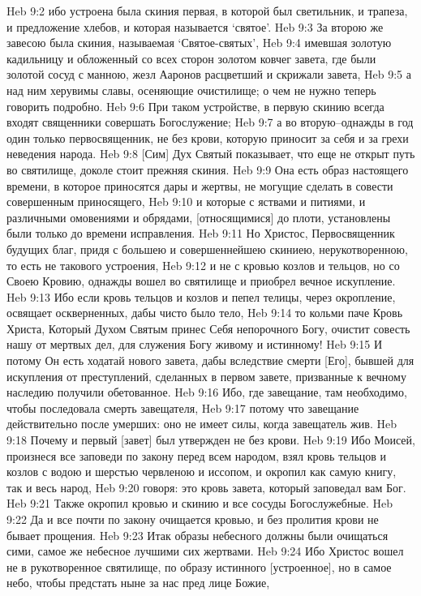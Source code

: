 Heb 9:2  ибо устроена была скиния первая, в которой был светильник, и трапеза, и предложение хлебов, и которая называется `святое'.
Heb 9:3  За второю же завесою была скиния, называемая `Святое-святых',
Heb 9:4  имевшая золотую кадильницу и обложенный со всех сторон золотом ковчег завета, где были золотой сосуд с манною, жезл Ааронов расцветший и скрижали завета,
Heb 9:5  а над ним херувимы славы, осеняющие очистилище; о чем не нужно теперь говорить подробно.
Heb 9:6  При таком устройстве, в первую скинию всегда входят священники совершать Богослужение;
Heb 9:7  а во вторую--однажды в год один только первосвященник, не без крови, которую приносит за себя и за грехи неведения народа.
Heb 9:8  [Сим] Дух Святый показывает, что еще не открыт путь во святилище, доколе стоит прежняя скиния.
Heb 9:9  Она есть образ настоящего времени, в которое приносятся дары и жертвы, не могущие сделать в совести совершенным приносящего,
Heb 9:10  и которые с яствами и питиями, и различными омовениями и обрядами, [относящимися] до плоти, установлены были только до времени исправления.
Heb 9:11  Но Христос, Первосвященник будущих благ, придя с большею и совершеннейшею скиниею, нерукотворенною, то есть не такового устроения,
Heb 9:12  и не с кровью козлов и тельцов, но со Своею Кровию, однажды вошел во святилище и приобрел вечное искупление.
Heb 9:13  Ибо если кровь тельцов и козлов и пепел телицы, через окропление, освящает оскверненных, дабы чисто было тело,
Heb 9:14  то кольми паче Кровь Христа, Который Духом Святым принес Себя непорочного Богу, очистит совесть нашу от мертвых дел, для служения Богу живому и истинному!
Heb 9:15  И потому Он есть ходатай нового завета, дабы вследствие смерти [Его], бывшей для искупления от преступлений, сделанных в первом завете, призванные к вечному наследию получили обетованное.
Heb 9:16  Ибо, где завещание, там необходимо, чтобы последовала смерть завещателя,
Heb 9:17  потому что завещание действительно после умерших: оно не имеет силы, когда завещатель жив.
Heb 9:18  Почему и первый [завет] был утвержден не без крови.
Heb 9:19  Ибо Моисей, произнеся все заповеди по закону перед всем народом, взял кровь тельцов и козлов с водою и шерстью червленою и иссопом, и окропил как самую книгу, так и весь народ,
Heb 9:20  говоря: это кровь завета, который заповедал вам Бог.
Heb 9:21  Также окропил кровью и скинию и все сосуды Богослужебные.
Heb 9:22  Да и все почти по закону очищается кровью, и без пролития крови не бывает прощения.
Heb 9:23  Итак образы небесного должны были очищаться сими, самое же небесное лучшими сих жертвами.
Heb 9:24  Ибо Христос вошел не в рукотворенное святилище, по образу истинного [устроенное], но в самое небо, чтобы предстать ныне за нас пред лице Божие,
